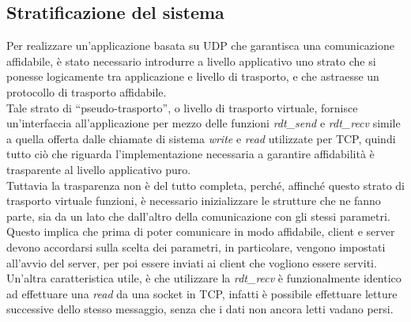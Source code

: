 \subsection{Stratificazione del sistema}
Per realizzare un'applicazione basata su UDP che garantisca una comunicazione 
affidabile, è stato necessario introdurre a livello applicativo uno strato che
si ponesse logicamente tra applicazione e livello di trasporto, e che astraesse
un protocollo di trasporto affidabile.\\
Tale strato di ``pseudo-trasporto'', o livello di trasporto virtuale, fornisce 
un'interfaccia all'applicazione 
per mezzo delle funzioni \emph{rdt\_send} e \emph{rdt\_recv} simile a quella 
offerta dalle chiamate di sistema \emph{write} e \emph{read} utilizzate per TCP, 
quindi tutto ciò che riguarda l'implementazione necessaria a garantire 
affidabilità è trasparente al livello applicativo puro.\\
Tuttavia la trasparenza non è del tutto completa, perché, affinché questo strato
di trasporto virtuale funzioni, è necessario inizializzare le strutture che ne 
fanno parte, sia da un lato che dall'altro della comunicazione con gli stessi 
parametri. Questo implica che prima di poter comunicare in modo affidabile, 
client e server devono accordarsi sulla scelta dei parametri, in particolare, 
vengono impostati all'avvio del server, per poi essere inviati ai client che 
vogliono essere serviti.\\
Un'altra caratteristica utile, è che utilizzare la \emph{rdt\_recv} è 
funzionalmente identico ad effettuare una \emph{read} da una socket in TCP, 
infatti è possibile effettuare letture successive dello stesso messaggio, senza 
che i dati non ancora letti vadano persi. 
